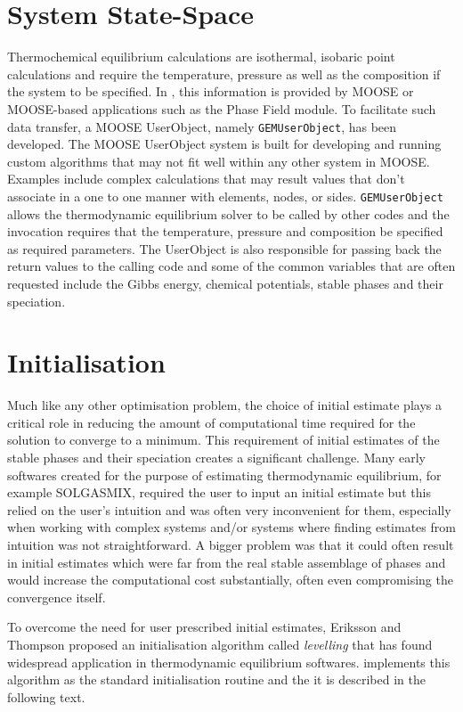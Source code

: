 \section{System State-Space}
	Thermochemical equilibrium calculations are isothermal, isobaric point calculations and require the temperature, pressure as well as the composition if the system to be specified. In {\GEM}, this information is provided by MOOSE or MOOSE-based applications such as the Phase Field module. To facilitate such data transfer, a MOOSE UserObject, namely \texttt{GEMUserObject}, has been developed. The MOOSE UserObject system is built for developing and running custom algorithms that may not fit well within any other system in MOOSE. Examples include complex calculations that may result values that don't associate in a one to one manner with elements, nodes, or sides. \texttt{GEMUserObject} allows the thermodynamic equilibrium solver to be called by other codes and the invocation requires that the temperature, pressure and composition be specified as required parameters. The UserObject is also responsible for passing back the return values to the calling code and some of the common variables that are often requested include the Gibbs energy, chemical potentials, stable phases and their speciation.

\section{Initialisation}
	Much like any other optimisation problem, the choice of initial estimate plays a critical role in reducing the amount of computational time required for the solution to converge to a minimum. This requirement of initial estimates of the stable  phases and their speciation creates a significant challenge. Many early softwares created for the purpose of estimating thermodynamic equilibrium, for example SOLGASMIX, required the user to input an initial estimate but this relied on the user's intuition and was often very inconvenient for them, especially when working with complex systems and/or systems where finding estimates from intuition was not straightforward. A bigger problem was that it could often result in initial estimates which were far from the real stable assemblage of phases and would increase the computational cost substantially, often even compromising the convergence itself. 

	To overcome the need for user prescribed initial estimates, Eriksson and Thompson \cite{Eriksson89} proposed an initialisation algorithm called \emph{levelling} that has found widespread application in thermodynamic equilibrium softwares. {\GEM} implements this algorithm as the standard initialisation routine and the it is described in the following text.
	
